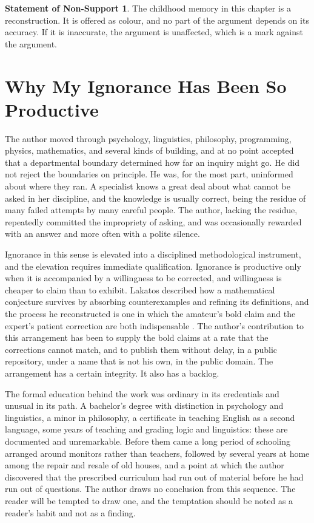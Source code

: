 \documentclass[11pt,openany,twoside]{book}
\theoremstyle{plain}
\theoremstyle{definition}
\newtheorem{nonsupport}{Statement of Non-Support}
\theoremstyle{remark}
\begin{document}
\begin{nonsupport}
The childhood memory in this chapter is a reconstruction. It is offered as colour, and no part of the argument depends on its accuracy. If it is inaccurate, the argument is unaffected, which is a mark against the argument.
\end{nonsupport}

\chapter{Why My Ignorance Has Been So Productive}

The author moved through psychology, linguistics, philosophy, programming, physics, mathematics, and several kinds of building, and at no point accepted that a departmental boundary determined how far an inquiry might go. He did not reject the boundaries on principle. He was, for the most part, uninformed about where they ran. A specialist knows a great deal about what cannot be asked in her discipline, and the knowledge is usually correct, being the residue of many failed attempts by many careful people. The author, lacking the residue, repeatedly committed the impropriety of asking, and was occasionally rewarded with an answer and more often with a polite silence.

Ignorance in this sense is elevated into a disciplined methodological instrument, and the elevation requires immediate qualification. Ignorance is productive only when it is accompanied by a willingness to be corrected, and willingness is cheaper to claim than to exhibit. Lakatos described how a mathematical conjecture survives by absorbing counterexamples and refining its definitions, and the process he reconstructed is one in which the amateur's bold claim and the expert's patient correction are both indispensable \cite{lakatos-proofs}. The author's contribution to this arrangement has been to supply the bold claims at a rate that the corrections cannot match, and to publish them without delay, in a public repository, under a name that is not his own, in the public domain. The arrangement has a certain integrity. It also has a backlog.

The formal education behind the work was ordinary in its credentials and unusual in its path. A bachelor's degree with distinction in psychology and linguistics, a minor in philosophy, a certificate in teaching English as a second language, some years of teaching and grading logic and linguistics: these are documented and unremarkable. Before them came a long period of schooling arranged around monitors rather than teachers, followed by several years at home among the repair and resale of old houses, and a point at which the author discovered that the prescribed curriculum had run out of material before he had run out of questions. The author draws no conclusion from this sequence. The reader will be tempted to draw one, and the temptation should be noted as a reader's habit and not as a finding.
\end{document}
